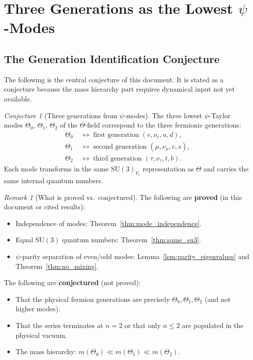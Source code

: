 \documentclass[12pt,a4paper]{article}
\theoremstyle{remark}
\newtheorem{remark}[theorem]{Remark}
\newtheorem{conjecture}[theorem]{Conjecture}
\begin{document}
\section{Three Generations as the Lowest $\psi$-Modes}
\label{sec:three_gen}

\subsection{The Generation Identification Conjecture}

The following is the central conjecture of this document.  It is stated as
a conjecture because the mass hierarchy part requires dynamical input not yet
available.

\begin{conjecture}[Three generations from $\psi$-modes]
  \label{conj:three_gen}
  The three lowest $\psi$-Taylor modes $\Theta_0$, $\Theta_1$, $\Theta_2$
  of the $\Theta$-field correspond to the three fermionic generations:
  \begin{align*}
    \Theta_0 &\;\longleftrightarrow\; \text{first generation
      } (e, \nu_e, u, d), \\
    \Theta_1 &\;\longleftrightarrow\; \text{second generation
      } (\mu, \nu_\mu, c, s), \\
    \Theta_2 &\;\longleftrightarrow\; \text{third generation
      } (\tau, \nu_\tau, t, b).
  \end{align*}
  Each mode transforms in the same $\mathrm{SU}(3)_{V_c}$ representation as
  $\Theta$ and carries the same internal quantum numbers.
\end{conjecture}

\begin{remark}[What is proved vs.\ conjectured]
  The following are \textbf{proved} (in this document or cited results):
  \begin{itemize}
    \item Independence of modes: Theorem~\ref{thm:mode_independence}.
    \item Equal $\mathrm{SU}(3)$ quantum numbers: Theorem~\ref{thm:same_su3}.
    \item $\psi$-parity separation of even/odd modes: Lemma~\ref{lem:parity_eigenvalues}
      and Theorem~\ref{thm:no_mixing}.
  \end{itemize}
  The following are \textbf{conjectured} (not proved):
  \begin{itemize}
    \item That the physical fermion generations are precisely $\Theta_0, \Theta_1, \Theta_2$
      (and not higher modes).
    \item That the series terminates at $n = 2$ or that only $n \leq 2$ are
      populated in the physical vacuum.
    \item The mass hierarchy: $m(\Theta_0) \ll m(\Theta_1) \ll m(\Theta_2)$.
  \end{itemize}
\end{remark}
\end{document}
